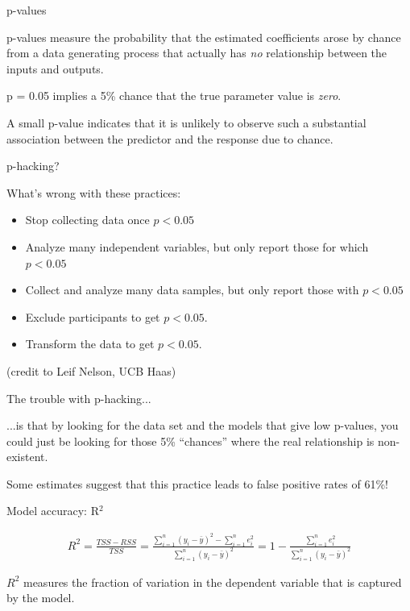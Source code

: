 \documentclass[aspectratio=169]{beamer}
\begin{document}
\begin{frame}{p-values}

p-values measure the probability that the estimated coefficients arose by chance from a data generating process that actually has \textit{no} relationship between the inputs and outputs.  

\vspace{5mm}

p = 0.05 implies a 5\% chance that the true parameter value is \textit{zero}.  

\vspace{5mm}

A small p-value indicates that it is unlikely to observe such a substantial association between the predictor and the response due to chance.

\end{frame}

\begin{frame}{p-hacking?}

What's wrong with these practices:
\begin{itemize}
  \item Stop collecting data once $p<0.05$
  \item Analyze many independent variables, but only report those for which $p<0.05$
  \item Collect and analyze many data samples, but only report those with $p<0.05$
  \item Exclude participants to get  $p<0.05$.
  \item Transform the data to get  $p<0.05$.
\end{itemize}

(credit to Leif Nelson, UCB Haas)

\end{frame}

\begin{frame}{The trouble with p-hacking...}

...is that by looking for the data set and the models that give low p-values, you could just be looking for those 5\% ``chances'' where the real relationship is non-existent.

\vspace{5mm}\pause

Some estimates suggest that this practice leads to false positive rates of 61\%!

\end{frame}


\begin{frame}{Model accuracy: R$^2$}

  \begin{align*}
    R^2 = \frac{TSS - RSS}{TSS} = \frac{\sum_{i=1}^n (y_i-\bar{y})^2 - \sum_{i=1}^n e_i^2}{\sum_{i=1}^n (y_i-\bar{y})^2} = 1-\frac{\sum_{i=1}^n e_i^2}{\sum_{i=1}^n (y_i-\bar{y})^2} 
  \end{align*}

  \pause
  $R^2$ measures the fraction of variation in the dependent variable that is captured by the model.  

\end{frame}
\end{document}
